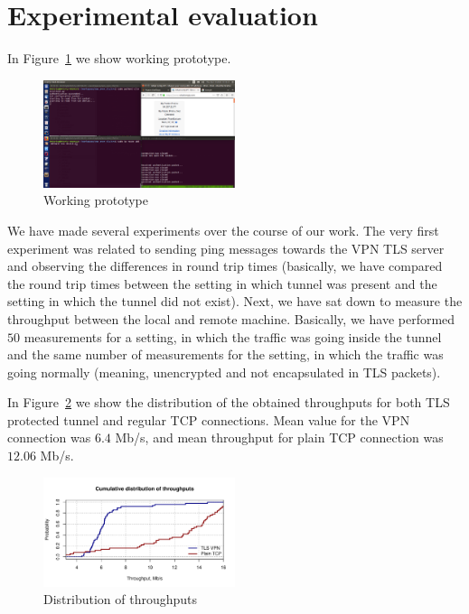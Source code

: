\section{Experimental evaluation}
\label{section:experiments}

In Figure~\ref{fig:prototype} we show working prototype.

\begin{figure}[!h]
        \includegraphics[width=0.5\textwidth]{graphics/vpn_over_tls_prototype.png}
        \caption{Working prototype}
        \label{fig:prototype}
\end{figure}

We have made several experiments over the course of our work. The very first experiment was 
related to sending ping messages towards the VPN TLS server and observing the differences in
round trip times (basically, we have compared the round trip times between the setting in 
which tunnel was present and the setting in which the tunnel did not exist). Next, we have
sat down to measure the throughput between the local and remote machine. Basically, we have 
performed $50$ measurements for a setting, in which the traffic was going inside the tunnel
and the same number of measurements for the setting, in which the traffic was going 
normally (meaning, unencrypted and not encapsulated in TLS packets).

In Figure~\ref{fig:iperf_distr} we show the distribution of the obtained throughputs for both
TLS protected tunnel and regular TCP connections. Mean value for the VPN connection was 
$6.4$ Mb/s, and mean throughput for plain TCP connection was $12.06$ Mb/s.

\begin{figure}[!h]
        \includegraphics[width=0.5\textwidth]{graphics/throughput.pdf}
        \caption{Distribution of throughputs}
        \label{fig:iperf_distr}
\end{figure}

